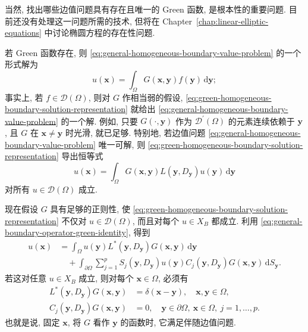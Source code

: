 当然, 找出哪些边值问题具有存在且唯一的 Green 函数, 是根本性的重要问题. 目前还没有处理这一问题所需的技术, 但将在 Chapter~\ref{chap:linear-elliptic-equations} 中讨论椭圆方程的存在性问题.

若 Green 函数存在, 则 \eqref{eq:general-homogeneous-boundary-value-problem} 的一个形式解为
\begin{equation}\label{eq:green-homogeneous-boundary-solution-representation}
u(\bm{x})=\int_\Omega G(\bm{x},\bm{y})f(\bm{y})\,\mathrm{d}\bm{y};
\end{equation}
事实上, 若 $f\in\mathcal{D}(\Omega)$, 则对 $G$ 作相当弱的假设, \eqref{eq:green-homogeneous-boundary-solution-representation} 就给出 \eqref{eq:general-homogeneous-boundary-value-problem} 的一个解. 例如, 只要 $G(\cdot,\bm{y})$ 作为 $\mathcal{D}^{\prime}(\Omega)$ 的元素连续依赖于 $\bm{y}$, 且 $G$ 在 $\bm{x}\ne\bm{y}$ 时光滑, 就已足够. 特别地, 若边值问题 \eqref{eq:general-homogeneous-boundary-value-problem} 唯一可解, 则 \eqref{eq:green-homogeneous-boundary-solution-representation} 导出恒等式
\begin{equation}\label{eq:green-test-function-representation-identity}
u(\bm{x})=\int_\Omega G(\bm{x},\bm{y})L(\bm{y},D_{\bm{y}})u(\bm{y})\,\mathrm{d}\bm{y}
\end{equation}
对所有 $u\in\mathcal{D}(\Omega)$ 成立.

现在假设 $G$ 具有足够的正则性, 使 \eqref{eq:green-homogeneous-boundary-solution-representation} 不仅对 $u\in\mathcal{D}(\Omega)$, 而且对每个 $u\in X_B$ 都成立. 利用 \eqref{eq:general-boundary-operator-green-identity}, 得到
\begin{equation}\label{eq:green-adjoint-kernel-boundary-derivation}
\begin{aligned}
u(\bm{x})&=\int_\Omega u(\bm{y})L^*(\bm{y},D_{\bm{y}})G(\bm{x},\bm{y})\,\mathrm{d}\bm{y}\\
&\quad+\int_{\partial\Omega}\sum_{j=1}^p S_j(\bm{y},D_{\bm{y}})u(\bm{y})C_j(\bm{y},D_{\bm{y}})G(\bm{x},\bm{y})\,\mathrm{d}S_{\bm{y}}.
\end{aligned}
\end{equation}
若这对任意 $u\in X_B$ 成立, 则对每个 $\bm{x}\in\Omega$, 必须有
\begin{equation}\label{eq:green-kernel-adjoint-variable-problem}
\begin{aligned}
L^*(\bm{y},D_{\bm{y}})G(\bm{x},\bm{y})&=\delta(\bm{x}-\bm{y}),\quad\bm{x},\bm{y}\in\Omega,\\
C_j(\bm{y},D_{\bm{y}})G(\bm{x},\bm{y})&=0,\quad\bm{y}\in\partial\Omega,\ \bm{x}\in\Omega,\ j=1,\ldots,p.
\end{aligned}
\end{equation}
也就是说, 固定 $\bm{x}$, 将 $G$ 看作 $\bm{y}$ 的函数时, 它满足伴随边值问题.

